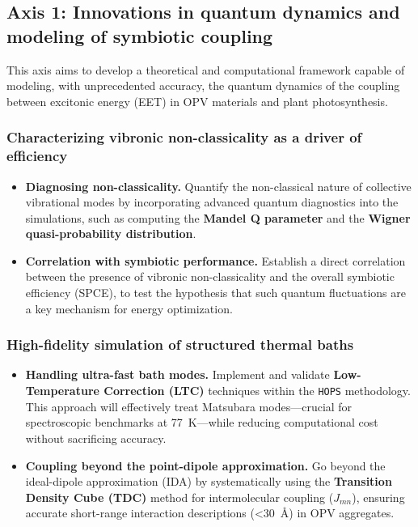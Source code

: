 \documentclass[12pt, a4paper]{article}
\begin{document}
\subsection{Axis 1: Innovations in quantum dynamics and modeling of symbiotic coupling}

This axis aims to develop a theoretical and computational framework capable of modeling, with unprecedented accuracy, the quantum dynamics of the coupling between excitonic energy (EET) in OPV materials and plant photosynthesis.

\subsubsection{Characterizing vibronic non-classicality as a driver of efficiency}
\begin{itemize}
    \item \textbf{Diagnosing non-classicality.} Quantify the non-classical nature of collective vibrational modes by incorporating advanced quantum diagnostics into the simulations, such as computing the \textbf{Mandel Q parameter} and the \textbf{Wigner quasi-probability distribution}.

    \item \textbf{Correlation with symbiotic performance.} Establish a direct correlation between the presence of vibronic non-classicality and the overall symbiotic efficiency (SPCE), to test the hypothesis that such quantum fluctuations are a key mechanism for energy optimization.
\end{itemize}

\subsubsection{High-fidelity simulation of structured thermal baths}
\begin{itemize}
    \item \textbf{Handling ultra-fast bath modes.} Implement and validate \textbf{Low-Temperature Correction (LTC)} techniques within the \texttt{HOPS} methodology. This approach will effectively treat Matsubara modes—crucial for spectroscopic benchmarks at \SI{77}{\kelvin}—while reducing computational cost without sacrificing accuracy.

    \item \textbf{Coupling beyond the point-dipole approximation.} Go beyond the ideal-dipole approximation (IDA) by systematically using the \textbf{Transition Density Cube (TDC)} method for intermolecular coupling ($J_{mn}$), ensuring accurate short-range interaction descriptions (\SI{<30}{\angstrom}) in OPV aggregates.
\end{itemize}
\end{document}
